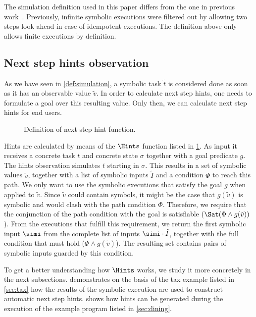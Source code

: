 The simulation definition used in this paper differs from the one in previous work~\cite{Naus2019}.
Previously, infinite symbolic executions were filtered out by allowing two steps look-ahead in case of idempotent executions.
The definition above only allows finite executions by definition.

\subsection{Next step hints observation}
\label{sub:hints}

As we have seen in \cref{def:simulation}, a symbolic task $\tilde{t}$ is considered done as soon as it has an observable value $\tilde{v}$.
In order to calculate next step hints, one needs to formulate a goal over this resulting value.
Only then, we can calculate next step hints for end users.

\begin{figure}
  \centering
  \caption{Definition of next step hint function.}
  \label{fig:hints}
\end{figure}

Hints are calculated by means of the $\Hints$ function listed in \cref{fig:hints}.
As input it receives a concrete task $t$ and concrete state $\sigma$ together with a goal predicate $g$.
The hints observation simulates $t$ starting in $\sigma$.
This results in a set of symbolic values $\tilde{v}$, together with a list of symbolic inputs $\tilde{I}$ and a condition $\Phi$ to reach this path.
We only want to use the symbolic executions that satisfy the goal $g$ when applied to $\tilde{v}$.
Since $\tilde{v}$ could contain symbols, it might be the case that $g(\tilde{v})$ is symbolic and would clash with the path condition $\Phi$.
Therefore, we require that the conjunction of the path condition with the goal is satisfiable ($\Sat(\Phi\land g(\tilde{v}))$).
From the executions that fulfill this requirement, we return the first symbolic input $\simi$ from the complete list of inputs $\simi\cdot\tilde{I}$,
together with the full condition that must hold ($\Phi\land g(\tilde{v})$).
The resulting set contains pairs of symbolic inputs guarded by this condition.

To get a better understanding how $\Hints$ works,
we study it more concretely in the next subsections.
 demonstrates on the basis of the tax example listed in \cref{sec:tax} how the results of the symbolic execution are used to construct automatic next step hints.
 shows how hints can be generated during the execution of the example \TOPHAT program listed in \cref{sec:dining}.



